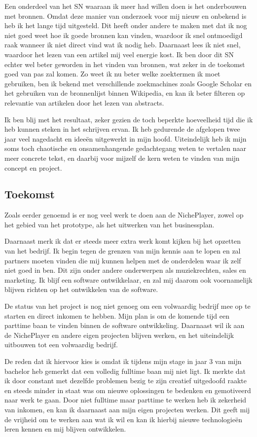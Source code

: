 Een onderdeel van het SN waaraan ik meer had willen doen is het onderbouwen met bronnen. Omdat deze manier van onderzoek voor mij nieuw en onbekend is heb ik het lange tijd uitgesteld. Dit heeft onder andere te maken met dat ik nog niet goed weet hoe ik goede bronnen kan vinden, waardoor ik snel ontmoedigd raak wanneer ik niet direct vind wat ik nodig heb. Daarnaast lees ik niet snel, waardoor het lezen van een artikel mij veel energie kost. Ik ben door dit SN echter wel beter geworden in het vinden van bronnen, wat zeker in de toekomst goed van pas zal komen. Zo weet ik nu beter welke zoektermen ik moet gebruiken, ben ik bekend met verschillende zoekmachines zoals Google Scholar en het gebruiken van de bronnenlijst binnen Wikipedia, en kan ik beter filteren op relevantie van artikelen door het lezen van abstracts.

Ik ben blij met het resultaat, zeker gezien de toch beperkte hoeveelheid tijd die ik heb kunnen steken in het schrijven ervan. Ik heb gedurende de afgelopen twee jaar veel nagedacht en ideeën uitgewerkt in mijn hoofd. Uiteindelijk heb ik mijn soms toch chaotische en onsamenhangende gedachtegang weten te vertalen naar meer concrete tekst, en daarbij voor mijzelf de kern weten te vinden van mijn concept en project.

\subsection{Toekomst}
Zoals eerder genoemd is er nog veel werk te doen aan de NichePlayer, zowel op het gebied van het prototype, als het uitwerken van het businessplan.

Daarnaast merk ik dat er steeds meer extra werk komt kijken bij het opzetten van het bedrijf. Ik begin tegen de grenzen van mijn kennis aan te lopen en zal partners moeten vinden die mij kunnen helpen met de onderdelen waar ik zelf niet goed in ben. Dit zijn onder andere onderwerpen als muziekrechten, sales en marketing. Ik blijf een software ontwikkelaar, en zal mij daarom ook voornamelijk blijven richten op het ontwikkelen van de software.

De status van het project is nog niet genoeg om een volwaardig bedrijf mee op te starten en direct inkomen te hebben. Mijn plan is om de komende tijd een parttime baan te vinden binnen de software ontwikkeling. Daarnaast wil ik aan de NichePlayer en andere eigen projecten blijven werken, en het uiteindelijk uitbouwen tot een volwaardig bedrijf.

De reden dat ik hiervoor kies is omdat ik tijdens mijn stage in jaar 3 van mijn bachelor heb gemerkt dat een volledig fulltime baan mij niet ligt. Ik merkte dat ik door constant met dezelfde problemen bezig te zijn creatief uitgedoofd raakte en steeds minder in staat was om nieuwe oplossingen te bedenken en gemotiveerd naar werk te gaan. Door niet fulltime maar parttime te werken heb ik zekerheid van inkomen, en kan ik daarnaast aan mijn eigen projecten werken. Dit geeft mij de vrijheid om te werken aan wat ik wil en kan ik hierbij nieuwe technologieën leren kennen en mij blijven ontwikkelen.

